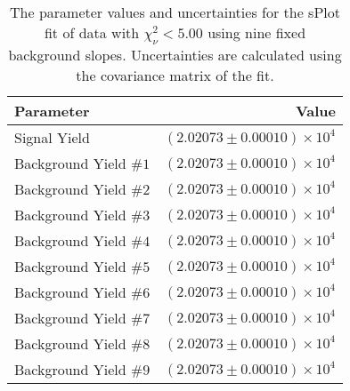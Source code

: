 
\begin{table}[ht]
    \begin{center}
        \begin{tabular}{lr}\toprule
            Parameter & Value \\\midrule
            Signal Yield & $(2.02073 \pm 0.00010) \times 10^{4}$ \\
            Background Yield $\#1$ & $(2.02073 \pm 0.00010) \times 10^{4}$ \\
            Background Yield $\#2$ & $(2.02073 \pm 0.00010) \times 10^{4}$ \\
            Background Yield $\#3$ & $(2.02073 \pm 0.00010) \times 10^{4}$ \\
            Background Yield $\#4$ & $(2.02073 \pm 0.00010) \times 10^{4}$ \\
            Background Yield $\#5$ & $(2.02073 \pm 0.00010) \times 10^{4}$ \\
            Background Yield $\#6$ & $(2.02073 \pm 0.00010) \times 10^{4}$ \\
            Background Yield $\#7$ & $(2.02073 \pm 0.00010) \times 10^{4}$ \\
            Background Yield $\#8$ & $(2.02073 \pm 0.00010) \times 10^{4}$ \\
            Background Yield $\#9$ & $(2.02073 \pm 0.00010) \times 10^{4}$ \\\bottomrule
        \end{tabular}
        \caption{The parameter values and uncertainties for the sPlot fit of data with $\chi^2_\nu < 5.00$ using nine fixed background slopes. Uncertainties are calculated using the covariance matrix of the fit.}\label{tab:splot-fit-results-chisqdof-5.00-fixed-9}
    \end{center}
\end{table}
